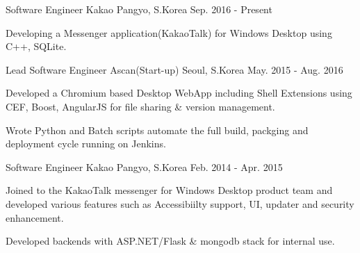 

\begin{cventries}

  \cventry
    {Software Engineer} %
    {Kakao} %
    {Pangyo, S.Korea} %
    {Sep. 2016 - Present} %
    {
      \begin{cvitems} %
        \item {Developing a Messenger application(KakaoTalk) for Windows Desktop using C++, SQLite.}
      \end{cvitems}
    }

  \cventry
    {Lead Software Engineer} %
    {Ascan(Start-up)} %
    {Seoul, S.Korea} %
    {May. 2015 - Aug. 2016} %
    {
      \begin{cvitems} %
        \item {Developed a Chromium based Desktop WebApp including Shell
    Extensions using CEF, Boost, AngularJS for file sharing \& version management.}
        \item {Wrote Python and Batch scripts automate the full build, packging and deployment cycle running on Jenkins.}
      \end{cvitems}
    }

  \cventry
    {Software Engineer} %
    {Kakao} %
    {Pangyo, S.Korea} %
    {Feb. 2014 - Apr. 2015} %
    {
      \begin{cvitems} %
        \item {Joined to the KakaoTalk messenger for Windows Desktop product team and developed various features such as Accessibiilty support, UI, updater and security enhancement. }
        \item {Developed backends with ASP.NET/Flask \& mongodb stack for internal use.}
      \end{cvitems}
    }


\end{cventries}
